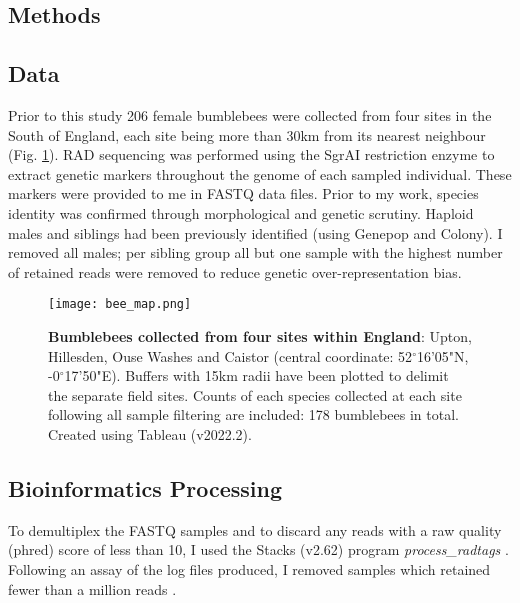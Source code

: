 \documentclass[12pt]{article}
\begin{document}
\begin{linenumbers}
   
   
    \section{Methods}
    
    
    	\subsection{Data}

    	Prior to this study 206 female bumblebees were collected from four sites in the South of England, each site being more than 30km from its nearest neighbour (Fig. \ref{fig:Bee sample sites}). RAD sequencing was performed using the SgrAI restriction enzyme to extract genetic markers throughout the genome of each sampled individual. These markers were provided to me in FASTQ data files. Prior to my work, species identity was confirmed through morphological and genetic scrutiny. Haploid males and siblings had been previously identified (using Genepop and Colony). I removed all males; per sibling group all but one sample with the highest number of retained reads were removed to reduce genetic over-representation bias.
    	
    	\begin{figure}[ht!]
    		\centering
    		\texttt{[image: bee\_map.png]}
    		\captionsetup{width=0.88\linewidth}
    		\caption{\textbf{Bumblebees collected from four sites within England}: Upton, Hillesden, Ouse Washes and Caistor (central coordinate: 52$^{\circ}$16'05"N, -0$^{\circ}$17'50"E). Buffers with 15km radii have been plotted to delimit the separate field sites. Counts of each species collected at each site following all sample filtering are included: 178 bumblebees in total. Created using Tableau (v2022.2).}
    		\label{fig:Bee sample sites}
    	\end{figure}
    	
    	
    	\subsection{Bioinformatics Processing}

    	
    	To demultiplex the FASTQ samples and to discard any reads with a raw quality (phred) score of less than 10, I used the Stacks (v2.62) program \emph{process\_radtags} \citep{catchen_stacks_2013}. Following an assay of the log files produced, I removed samples which retained fewer than a million reads \citep{rochette_deriving_2017, rivera-colon_population_2021}. 
    	

\end{linenumbers}
\end{document}
